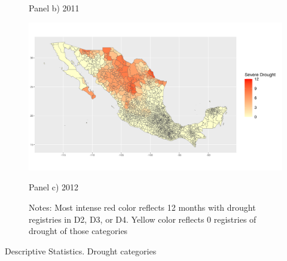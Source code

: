 \documentclass[12pt, oneside]{article}      %
\begin{document}
\begin{figure}[!ht]
\begin{minipage}[b]{0.55\textwidth}
        \caption*{Panel b) 2011}
    \end{minipage}
    \hfill
    \begin{minipage}[b]{0.55\textwidth}
        \centering
        \includegraphics[width=\linewidth]{figures/drought_2012.png} %
        \caption*{Panel c) 2012}
    \end{minipage}
    \label{fig:droughts_geographical}
    \caption*{\footnotesize{Notes: Most intense red color reflects 12 months with drought registries in D2, D3, or D4. Yellow color reflects 0 registries of drought of those categories}}
\end{figure}



\clearpage
\newpage

\begin{table}[!ht]
\begin{center}
\caption{Descriptive Statistics. Drought categories}\label{tab:descriptives_drought}
\noindent
\caption*{\footnotesize{Notes:  }}
\end{center}
\end{table}
\end{document}
